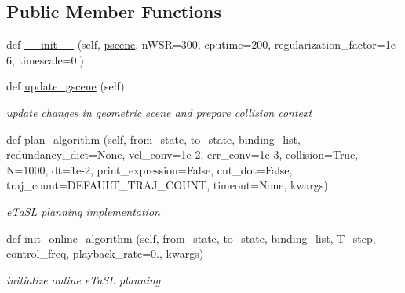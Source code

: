 \subsection*{Public Member Functions}
\begin{DoxyCompactItemize}
\item 
def \hyperlink{classrnb-planning_1_1src_1_1pkg_1_1planning_1_1motion_1_1etasl_1_1etasl_1_1_etasl_planner_af097404c7d380f72df98f1dd100373b8}{\+\_\+\+\_\+init\+\_\+\+\_\+} (self, \hyperlink{classrnb-planning_1_1src_1_1pkg_1_1planning_1_1motion_1_1interface_1_1_motion_interface_a00c505ee267290c0439334e007b216bd}{pscene}, n\+W\+SR=300, cputime=200, regularization\+\_\+factor=1e-\/6, timescale=0.)
\item 
\mbox{\label{classrnb-planning_1_1src_1_1pkg_1_1planning_1_1motion_1_1etasl_1_1etasl_1_1_etasl_planner_a9b35f1c4e35004bc15820dd96e08e25e}} 
def \hyperlink{classrnb-planning_1_1src_1_1pkg_1_1planning_1_1motion_1_1etasl_1_1etasl_1_1_etasl_planner_a9b35f1c4e35004bc15820dd96e08e25e}{update\+\_\+gscene} (self)
\begin{DoxyCompactList}\small\item\em update changes in geometric scene and prepare collision context \end{DoxyCompactList}\item 
def \hyperlink{classrnb-planning_1_1src_1_1pkg_1_1planning_1_1motion_1_1etasl_1_1etasl_1_1_etasl_planner_a4e26195165d7114157e2cb1a53671a6e}{plan\+\_\+algorithm} (self, from\+\_\+state, to\+\_\+state, binding\+\_\+list, redundancy\+\_\+dict=None, vel\+\_\+conv=1e-\/2, err\+\_\+conv=1e-\/3, collision=\+True, N=1000, dt=1e-\/2, print\+\_\+expression=\+False, cut\+\_\+dot=\+False, traj\+\_\+count=\+D\+E\+F\+A\+U\+L\+T\+\_\+\+T\+R\+A\+J\+\_\+\+C\+O\+U\+N\+T, timeout=\+None, kwargs)
\begin{DoxyCompactList}\small\item\em e\+Ta\+SL planning implementation \end{DoxyCompactList}\item 
def \hyperlink{classrnb-planning_1_1src_1_1pkg_1_1planning_1_1motion_1_1etasl_1_1etasl_1_1_etasl_planner_afa51cc991697d4812e6be0609e1ff589}{init\+\_\+online\+\_\+algorithm} (self, from\+\_\+state, to\+\_\+state, binding\+\_\+list, T\+\_\+step, control\+\_\+freq, playback\+\_\+rate=0., kwargs)
\begin{DoxyCompactList}\small\item\em initialize online e\+Ta\+SL planning \end{DoxyCompactList}\item 

\end{DoxyCompactItemize}
